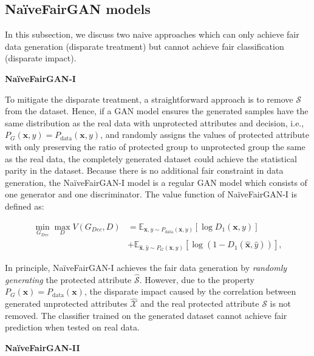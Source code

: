\documentclass[sigconf]{acmart}
\theoremstyle{definition}
\begin{document}
\subsection{Na\"iveFairGAN models}
In this subsection, we discuss two naive approaches which can only achieve fair data generation (disparate treatment) but cannot achieve fair classification (disparate impact). 

{\bf \noindent Na\"iveFairGAN-I}

To mitigate the disparate treatment, a straightforward approach is to remove $\mathcal{S}$ from the dataset. Hence, if a GAN model ensures the generated samples have the same distribution as the real data with unprotected attributes and decision, i.e., $P_G(\mathbf{x},y)=P_{\text{data}}(\mathbf{x},y)$, and randomly assigns the values of protected attribute with only preserving the ratio of protected group to unprotected group the same as the real data, the completely generated dataset could achieve the statistical parity in the dataset. Because there is no additional fair constraint in data generation, the Na\"iveFairGAN-I model is a regular GAN model which consists of one generator and one discriminator. The value function of Na\"iveFairGAN-I is defined as:

\begin{equation*}
\begin{split}
	\min_{G_{Dec}} \max_{D}  V(G_{Dec}, D)  &= \mathbb{E}_{\mathbf{x},y \sim P_{\text{data}}(\mathbf{x},y)}{[\log D_1(\mathbf{x}, y)]} \\
	& + \mathbb{E}_{\hat{\mathbf{x}},\hat{y} \sim P_{G}(\mathbf{x},y)}{[\log (1 - D_1(\hat{\mathbf{x}},\hat{y}))]},
\end{split}
\end{equation*}

In principle, Na\"iveFairGAN-I achieves the fair data generation by \textit{randomly generating} the protected attribute $\hat{\mathcal{S}}$. However, due to the property $P_G(\mathbf{x}) = P_{\text{data}}(\mathbf{x})$, the disparate impact caused by the correlation between generated unprotected attributes $\hat{\mathcal{X}}$ and the real protected attribute $\mathcal{S}$ is not removed. The classifier trained on the generated dataset cannot achieve fair prediction when tested on real data. 


{\bf \noindent Na\"iveFairGAN-II}
\end{document}
